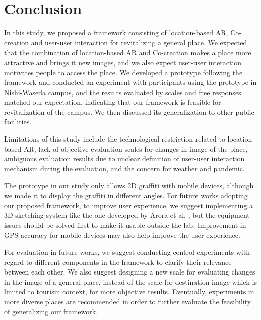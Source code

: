 \chapter{Conclusion}\label{ch:7}

In this study, we proposed a framework consisting of location-based AR, Co-creation and user-user interaction for revitalizing a general place.
We expected that the combination of location-based AR and Co-creation makes a place more attractive and brings it new images, and we also expect user-user interaction motivates people to access the place.
We developed a prototype following the framework and conducted an experiment with participants using the prototype in Nishi-Waseda campus, and the results evaluated by scales and free responses matched our expectation,
indicating that our framework is feasible for revitalization of the campus.
We then discussed its generalization to other public facilities.

Limitations of this study include the technological restriction related to location-based AR, lack of objective evaluation scales for changes in image of the place,
ambiguous evaluation results due to unclear definition of user-user interaction mechanism during the evaluation, and the concern for weather and pandemic.

The prototype in our study only allows 2D graffiti with mobile devices, although we made it to display the graffiti in different angles.
For future works adopting our proposed framework, to improve user experience, we suggest implementing a 3D sketching system like the one developed by Arora et al. \cite{arora_habib_kazi_grossman_fitzmaurice_singh_2018}, but the equipment issues should be solved first to make it usable outside the lab.
Improvement in GPS accuracy for mobile devices may also help improve the user experience.

For evaluation in future works, we suggest conducting control experiments with regard to different components in the framework to clarify their relevance between each other.
We also suggest designing a new scale for evaluating changes in the image of a general place, instead of the scale for destination image which is limited to tourism context, for more objective results.
Eventually, experiments in more diverse places are recommended in order to further evaluate the feasibility of generalizing our framework.